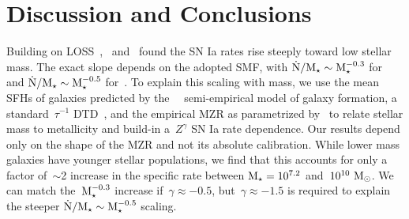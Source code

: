 \documentclass[foo.tex]{subfiles}
\begin{document}
\section{Discussion and Conclusions}
\label{sec:conclusions}

Building on LOSS~\citep{Li2011},~\citet{Brown2019} and~\citet{Wiseman2021}
found the SN Ia rates rise steeply toward low stellar mass.
The exact slope depends on the adopted SMF, with
$\dot{\text{N}} / \text{M}_\star \sim \text{M}_\star^{-0.3}$ for~\citet{Baldry2012} and
$\dot{\text{N}} / \text{M}_\star \sim \text{M}_\star^{-0.5}$ for~\citet{Bell2003}.
To explain this scaling with mass, we use the mean SFHs of galaxies predicted
by the~\um~\citep{Behroozi2019} semi-empirical model of galaxy formation, a
standard~$\tau^{-1}$ DTD~\citep[e.g.,][]{Maoz2012a}, and the empirical MZR as
parametrized by~\citet{Zahid2014} to relate stellar mass to metallicity and
build-in a~$Z^\gamma$ SN Ia rate dependence.
Our results depend only on the shape of the MZR and not its absolute
calibration.
While lower mass galaxies have younger stellar populations, we find that this
accounts for only a factor of~$\sim$2 increase in the specific rate between
$\text{M}_\star = 10^{7.2}$ and~$10^{10}~\text{M}_\odot$.
We can match the~$\text{M}_\star^{-0.3}$ increase if~$\gamma \approx -0.5$,
but~$\gamma \approx -1.5$ is required to explain the steeper
$\dot{\text{N}} / \text{M}_\star \sim \text{M}_\star^{-0.5}$ scaling.
\par
\end{document}
